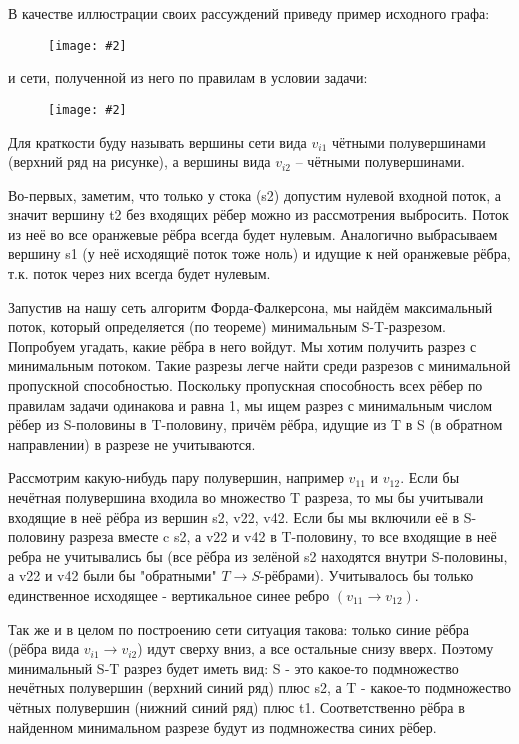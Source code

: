 \documentclass[a4paper,12pt]{article}
\numberwithin{figure}{section}
\newcommand\CenterFigure[2]{
	\begin{figure}[H]
		\centering
		\texttt{[image: \#2]}
	\end{figure}
}
\begin{document}
\begin{solution}
	В качестве иллюстрации своих рассуждений приведу пример исходного графа:
	
	\CenterFigure{5cm}{flow-problem-step-12-fig1.png}
	
	и сети, полученной из него по правилам в условии задачи:
	
	\CenterFigure{13cm}{flow-problem-step-12-fig2.png}
	
	Для краткости буду называть вершины сети вида $v_{i1}$ чётными полувершинами (верхний ряд на рисунке), а вершины вида $v_{i2}$ -- чётными полувершинами.
	
	Во-первых, заметим, что только у стока (s2) допустим нулевой входной поток, а значит вершину t2 без входящих рёбер можно из рассмотрения выбросить. Поток из неё во все оранжевые рёбра всегда будет нулевым. Аналогично выбрасываем вершину s1 (у неё исходящиё поток тоже ноль) и идущие к ней оранжевые рёбра, т.к. поток через них всегда будет нулевым.
	
	Запустив на нашу сеть алгоритм Форда-Фалкерсона, мы найдём максимальный поток, который определяется (по теореме) минимальным S-T-разрезом. Попробуем угадать, какие рёбра в него войдут. Мы хотим получить разрез с минимальным потоком. Такие разрезы легче найти среди разрезов с минимальной пропускной способностью. Поскольку пропускная способность всех рёбер по правилам задачи одинакова и равна 1, мы ищем разрез с минимальным числом рёбер из S-половины в T-половину, причём рёбра, идущие из T в S (в обратном направлении) в разрезе не учитываются.
	
	Рассмотрим какую-нибудь пару полувершин, например $v_{11}$ и $v_{12}$. Если бы нечётная полувершина входила во множество T разреза, то мы бы учитывали входящие в неё рёбра из вершин s2, v22, v42. Если бы мы включили её в S-половину разреза вместе c s2, а v22 и v42 в T-половину, то все входящие в неё ребра не учитывались бы (все рёбра из зелёной s2 находятся внутри S-половины, а v22 и v42 были бы "обратными" $T \rightarrow S$-рёбрами). Учитывалось бы только единственное исходящее - вертикальное синее ребро $(v_{11} \rightarrow v_{12})$.
	
	Так же и в целом по построению сети ситуация такова: только синие рёбра (рёбра вида $v_{i1} \rightarrow v_{i2}$) идут сверху вниз, а все остальные снизу вверх. Поэтому минимальный S-T разрез будет иметь вид: S - это какое-то подмножество нечётных полувершин (верхний синий ряд) плюс s2, а T - какое-то подмножество чётных полувершин (нижний синий ряд) плюс t1. Соответственно рёбра в найденном минимальном разрезе будут из подмножества синих рёбер.
	

\end{solution}
\end{document}
